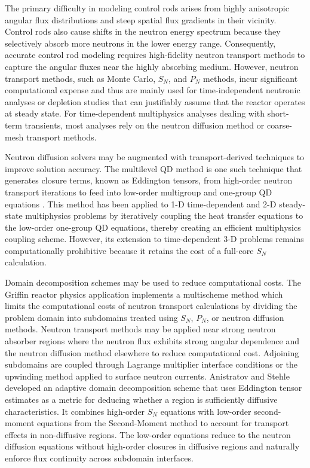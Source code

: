 The primary difficulty in modeling control rods arises from highly anisotropic angular flux
distributions and steep spatial flux gradients in their vicinity. Control rods also cause
shifts in the neutron energy spectrum because they selectively absorb more neutrons in the lower
energy range. Consequently, accurate control rod modeling requires
high-fidelity neutron transport methods to capture the angular fluxes near
the highly absorbing medium. However, neutron transport methods, such as Monte Carlo, $S_N$, and
$P_N$ methods, incur significant computational expense and thus are mainly used for
time-independent neutronic analyses or depletion studies that can justifiably assume that the
reactor operates at steady state. For time-dependent multiphysics analyses dealing with short-term
transients, most analyses rely on the neutron diffusion method or coarse-mesh transport methods.

Neutron diffusion solvers may be augmented with transport-derived techniques to improve
solution accuracy. The multilevel \gls{QD} method is one such technique that
generates closure terms, known as Eddington tensors, from high-order neutron transport iterations
to feed into low-order multigroup and one-group \gls{QD} equations
\cite{goldin_quasi-diffusion_1964, anistratov_solution_1986}. This method has been applied
to 1-D time-dependent and 2-D steady-state multiphysics problems \cite{tamang_multilevel_2014,
reynolds_analysis_2023} by iteratively coupling the heat transfer equations to the low-order
one-group \gls{QD} equations, thereby creating an efficient multiphysics coupling scheme.
However, its extension to time-dependent 3-D problems remains computationally prohibitive because
it retains the cost of a full-core $S_N$ calculation.

Domain decomposition schemes may be used to reduce computational costs. The Griffin
reactor physics application \cite{yang_development_2022} implements a multischeme method which
limits the computational costs of neutron transport calculations by dividing the problem domain
into subdomains treated using $S_N$, $P_N$, or neutron diffusion methods. Neutron transport
methods may be applied near strong neutron absorber regions where the neutron flux
exhibits strong angular dependence \cite{laboure_multischeme_2022} and the neutron diffusion method
elsewhere to reduce computational cost. Adjoining subdomains are coupled through
Lagrange multiplier interface conditions or the upwinding method applied to surface neutron
currents. Anistratov and Stehle \cite{anistratov_computational_2012} developed an adaptive domain
decomposition scheme that uses Eddington tensor estimates as a metric for deducing whether a region
is sufficiently diffusive characteristics. It combines high-order $S_N$ equations with low-order
second-moment equations from the Second-Moment method \cite{lewis_comparison_1976} to account for
transport effects in non-diffusive regions. The low-order equations reduce to the neutron diffusion
equations without high-order closures in diffusive regions and naturally enforce flux continuity
across subdomain interfaces.

